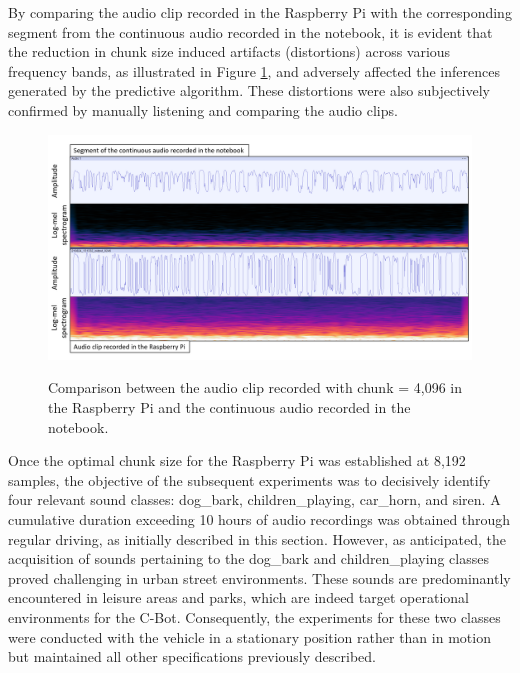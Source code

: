 By comparing the audio clip recorded in the Raspberry Pi with the corresponding segment from the continuous audio recorded in the notebook, it is evident that the reduction in chunk size induced artifacts (distortions) across various frequency bands, as illustrated in Figure \ref{fig:Results_evaluation_driving_streets_02_04}, and adversely affected the inferences generated by the predictive algorithm. These distortions were also subjectively confirmed by manually listening and comparing the audio clips.

\begin{figure}[htbp]
    \raggedright
        \caption{Comparison between the audio clip recorded with chunk = 4,096 in the Raspberry Pi and the continuous audio recorded in the notebook.}
        \includegraphics[width=1\textwidth]{resources/images/060-results/Results_evaluation_driving_streets_02_04.png}
        \label{fig:Results_evaluation_driving_streets_02_04}
\end{figure}

Once the optimal chunk size for the Raspberry Pi was established at 8,192 samples, the objective of the subsequent experiments was to decisively identify four relevant sound classes: dog\_bark, children\_playing, car\_horn, and siren. A cumulative duration exceeding 10 hours of audio recordings was obtained through regular driving, as initially described in this section. However, as anticipated, the acquisition of sounds pertaining to the dog\_bark and children\_playing classes proved challenging in urban street environments. These sounds are predominantly encountered in leisure areas and parks, which are indeed target operational environments for the C-Bot. Consequently, the experiments for these two classes were conducted with the vehicle in a stationary position rather than in motion but maintained all other specifications previously described.

